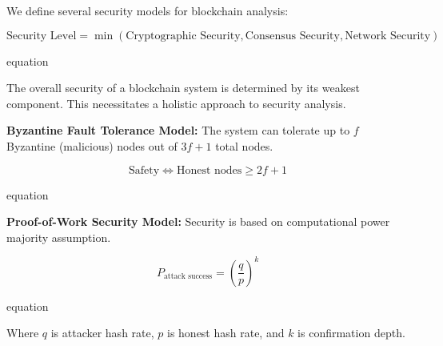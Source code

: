 We define several security models for blockchain analysis:

\begin{equation}
\text{Security Level} = \min(\text{Cryptographic Security}, \text{Consensus Security}, \text{Network Security})
\end{equation}

equation

The overall security of a blockchain system is determined by its weakest component. This necessitates a holistic approach to security analysis.

\textbf{Byzantine Fault Tolerance Model:}
The system can tolerate up to $f$ Byzantine (malicious) nodes out of $3f+1$ total nodes.

\begin{equation}
\text{Safety} \Leftrightarrow \text{Honest nodes} \geq 2f+1
\end{equation}

equation

\textbf{Proof-of-Work Security Model:}
Security is based on computational power majority assumption.

\begin{equation}
P_{\text{attack success}} = \left(\frac{q}{p}\right)^k
\end{equation}

equation

Where $q$ is attacker hash rate, $p$ is honest hash rate, and $k$ is confirmation depth.